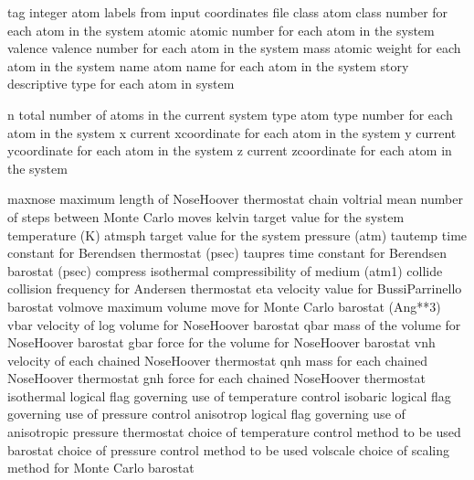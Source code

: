 \documentclass[letterpaper,11pt,english]{sphinxmanual}
\begin{document}
\begin{sphinxVerbatim}[commandchars=\\\{\}]
tag             integer atom labels from input coordinates file
class           atom class number for each atom in the system
atomic          atomic number for each atom in the system
valence         valence number for each atom in the system
mass            atomic weight for each atom in the system
name            atom name for each atom in the system
story           descriptive type for each atom in system
\end{sphinxVerbatim}


\begin{sphinxVerbatim}[commandchars=\\\{\}]
n               total number of atoms in the current system
type            atom type number for each atom in the system
x               current x\PYGZhy{}coordinate for each atom in the system
y               current y\PYGZhy{}coordinate for each atom in the system
z               current z\PYGZhy{}coordinate for each atom in the system
\end{sphinxVerbatim}


\begin{sphinxVerbatim}[commandchars=\\\{\}]
maxnose         maximum length of Nose\PYGZhy{}Hoover thermostat chain
voltrial        mean number of steps between Monte Carlo moves
kelvin          target value for the system temperature (K)
atmsph          target value for the system pressure (atm)
tautemp         time constant for Berendsen thermostat (psec)
taupres         time constant for Berendsen barostat (psec)
compress        isothermal compressibility of medium (atm\PYGZhy{}1)
collide         collision frequency for Andersen thermostat
eta             velocity value for Bussi\PYGZhy{}Parrinello barostat
volmove         maximum volume move for Monte Carlo barostat (Ang**3)
vbar            velocity of log volume for Nose\PYGZhy{}Hoover barostat
qbar            mass of the volume for Nose\PYGZhy{}Hoover barostat
gbar            force for the volume for Nose\PYGZhy{}Hoover barostat
vnh             velocity of each chained Nose\PYGZhy{}Hoover thermostat
qnh             mass for each chained Nose\PYGZhy{}Hoover thermostat
gnh             force for each chained Nose\PYGZhy{}Hoover thermostat
isothermal      logical flag governing use of temperature control
isobaric        logical flag governing use of pressure control
anisotrop       logical flag governing use of anisotropic pressure
thermostat      choice of temperature control method to be used
barostat        choice of pressure control method to be used
volscale        choice of scaling method for Monte Carlo barostat
\end{sphinxVerbatim}
\end{document}
